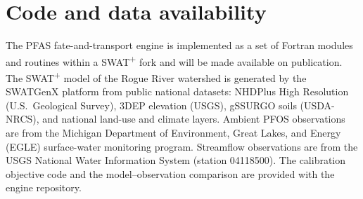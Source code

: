 \section*{Code and data availability}
The PFAS fate-and-transport engine is implemented as a set of Fortran modules and routines within a SWAT\textsuperscript{+} fork and will be made available on publication. The SWAT\textsuperscript{+} model of the Rogue River watershed is generated by the SWATGenX platform from public national datasets: NHDPlus High Resolution (U.S.\ Geological Survey), 3DEP elevation (USGS), gSSURGO soils (USDA-NRCS), and national land-use and climate layers. Ambient PFOS observations are from the Michigan Department of Environment, Great Lakes, and Energy (EGLE) surface-water monitoring program. Streamflow observations are from the USGS National Water Information System (station 04118500). The calibration objective code and the model--observation comparison are provided with the engine repository.
